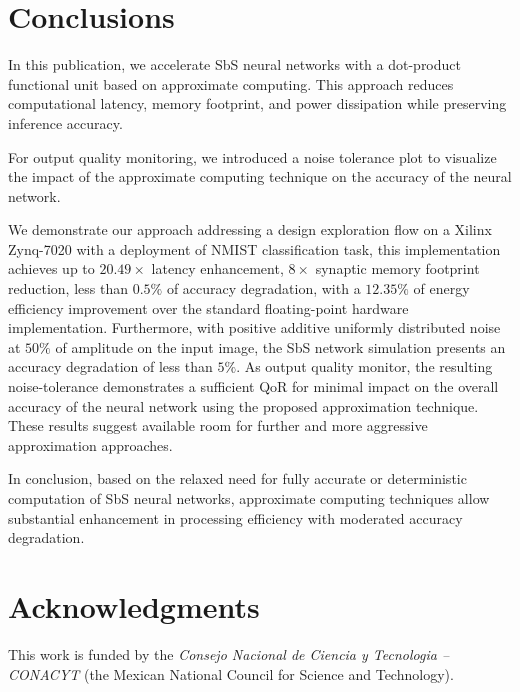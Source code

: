 \section{Conclusions}
\label{sec:conclusions}
In this publication, we accelerate SbS neural networks with a dot-product functional unit based on approximate computing. This approach reduces computational latency, memory footprint, and power dissipation while preserving inference accuracy.

For output quality monitoring, we introduced a noise tolerance plot to visualize the impact of the approximate computing technique on the accuracy of the neural network.

We demonstrate our approach addressing a design exploration flow on a Xilinx Zynq-7020 with a deployment of NMIST classification task, this implementation achieves up to $20.49\times$ latency enhancement, $8\times$ synaptic memory footprint reduction, less than $0.5\%$ of accuracy degradation, with a $12.35\%$ of energy efficiency improvement over the standard floating-point hardware implementation. Furthermore, with positive additive uniformly distributed noise at $50\%$ of amplitude on the input image, the SbS network simulation presents an accuracy degradation of less than $5\%$. As output quality monitor, the resulting noise-tolerance demonstrates a sufficient QoR for minimal impact on the overall accuracy of the neural network using the proposed approximation technique. These results suggest available room for further and more aggressive approximation approaches.

In conclusion, based on the relaxed need for fully accurate or deterministic computation of SbS neural networks, approximate computing techniques allow substantial enhancement in processing efficiency with moderated accuracy degradation.

\section * {Acknowledgments}\label{sec:Ack}
This work is funded by the \textit{Consejo Nacional de Ciencia y Tecnologia -- CONACYT} (the Mexican National Council for Science and Technology).
